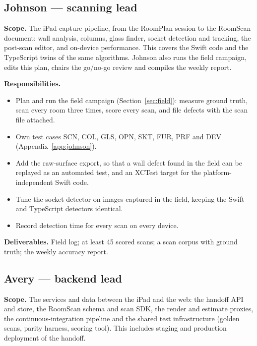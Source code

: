 \documentclass[conference,a4paper,10pt]{IEEEtran}
\begin{document}
\subsection{Johnson --- scanning lead}

\textbf{Scope.} The iPad capture pipeline, from the RoomPlan session to the
RoomScan document: wall analysis, columns, glass finder, socket detection and
tracking, the post-scan editor, and on-device performance. This covers the
Swift code and the TypeScript twins of the same algorithms. Johnson also runs
the field campaign, edits this plan, chairs the go/no-go review and compiles
the weekly report.

\textbf{Responsibilities.}
\begin{itemize}
\item Plan and run the field campaign (Section~\ref{sec:field}): measure
  ground truth, scan every room three times, score every scan, and file
  defects with the scan file attached.
\item Own test cases SCN, COL, GLS, OPN, SKT, FUR, PRF and DEV
  (Appendix~\ref{app:johnson}).
\item Add the raw-surface export, so that a wall defect found in the field
  can be replayed as an automated test, and an XCTest target for the
  platform-independent Swift code.
\item Tune the socket detector on images captured in the field, keeping the
  Swift and TypeScript detectors identical.
\item Record detection time for every scan on every device.
\end{itemize}

\textbf{Deliverables.} Field log; at least 45 scored scans; a scan corpus with
ground truth; the weekly accuracy report.

\subsection{Avery --- backend lead}

\textbf{Scope.} The services and data between the iPad and the web: the
handoff API and store, the RoomScan schema and scan SDK, the render and
estimate proxies, the continuous-integration pipeline and the shared test
infrastructure (golden scans, parity harness, scoring tool). This includes
staging and production deployment of the handoff.
\end{document}
